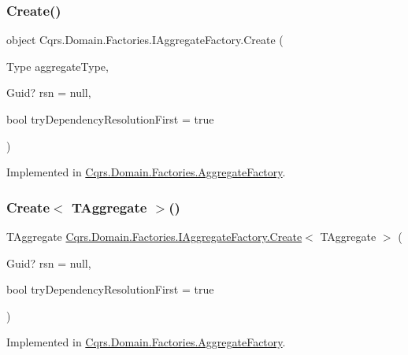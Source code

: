 \subsubsection{\texorpdfstring{Create()}{Create()}}
{\footnotesize\ttfamily object Cqrs.\+Domain.\+Factories.\+I\+Aggregate\+Factory.\+Create (\begin{DoxyParamCaption}\item[{Type}]{aggregate\+Type,  }\item[{Guid?}]{rsn = {\ttfamily null},  }\item[{bool}]{try\+Dependency\+Resolution\+First = {\ttfamily true} }\end{DoxyParamCaption})}



Implemented in \hyperlink{classCqrs_1_1Domain_1_1Factories_1_1AggregateFactory_a917794af09bb3f51629e7abc231f8441_a917794af09bb3f51629e7abc231f8441}{Cqrs.\+Domain.\+Factories.\+Aggregate\+Factory}.

\mbox{\label{interfaceCqrs_1_1Domain_1_1Factories_1_1IAggregateFactory_a3dcbf8900e0d536da241e2e94f74cdd5_a3dcbf8900e0d536da241e2e94f74cdd5}} 
\subsubsection{\texorpdfstring{Create$<$ T\+Aggregate $>$()}{Create< TAggregate >()}}
{\footnotesize\ttfamily T\+Aggregate \hyperlink{interfaceCqrs_1_1Domain_1_1Factories_1_1IAggregateFactory_ade388f0dfa9c42964392159a4f97fb1e_ade388f0dfa9c42964392159a4f97fb1e}{Cqrs.\+Domain.\+Factories.\+I\+Aggregate\+Factory.\+Create}$<$ T\+Aggregate $>$ (\begin{DoxyParamCaption}\item[{Guid?}]{rsn = {\ttfamily null},  }\item[{bool}]{try\+Dependency\+Resolution\+First = {\ttfamily true} }\end{DoxyParamCaption})}



Implemented in \hyperlink{classCqrs_1_1Domain_1_1Factories_1_1AggregateFactory_ac155d6c1e55ba37bacf420185b652092_ac155d6c1e55ba37bacf420185b652092}{Cqrs.\+Domain.\+Factories.\+Aggregate\+Factory}.

